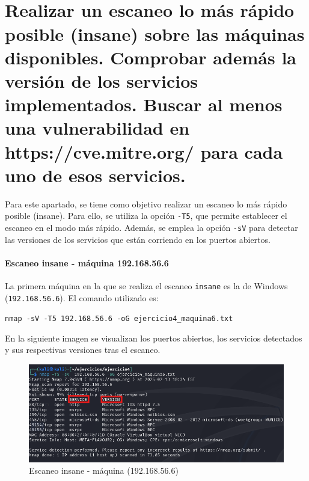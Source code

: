 \documentclass[a4paper,12pt]{article} %
\begin{document}
\newpage

\\ \\
\section{Realizar un escaneo lo más rápido posible (insane) sobre las máquinas disponibles. Comprobar además la versión de los servicios implementados. Buscar al menos una vulnerabilidad en https://cve.mitre.org/ para cada uno de esos servicios.}

Para este apartado, se tiene como objetivo realizar un escaneo lo más rápido posible (insane). Para ello, se utiliza la opción \texttt{-T5}, que permite establecer el escaneo en el modo más rápido. Además, se emplea la opción \texttt{-sV} para detectar las versiones de los servicios que están corriendo en los puertos abiertos. 

    \paragraph{Escaneo insane - máquina 192.168.56.6}
    La primera máquina en la que se realiza el escaneo \texttt{insane} es la de Windows (\texttt{192.168.56.6}). El comando utilizado es:
    
    \begin{center}
    \texttt{nmap -sV -T5 192.168.56.6  -oG ejercicio4\_maquina6.txt}
    \end{center}

    En la siguiente imagen se visualizan los puertos abiertos, los servicios detectados y sus respectivas versiones tras el escaneo. 
    
        \begin{figure} [hp!]
         \centering
         \includegraphics[width=1\textwidth]{Imagenes/vuln6.png}
         \caption{Escaneo insane - máquina (192.168.56.6) }
         \label{fig:wireshark2}
        \end{figure}
\end{document}
